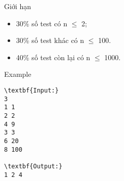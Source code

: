 Giới hạn
\begin{itemize}
	\item 30\% số test có n  $\le$  2;
	\item 30\% số test khác có n  $\le$  100.
	\item 40\% số test còn lại có n  $\le$  1000.
\end{itemize}
Example
\begin{verbatim}
\textbf{Input:}
3
1 1
2 2
4 9
3 3
6 20
8 100

\textbf{Output:}
1 2 4
\end{verbatim}